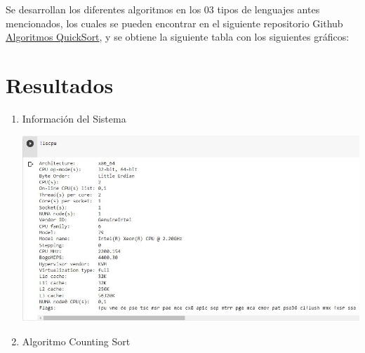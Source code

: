 \documentclass{article}
\begin{document}
  Se desarrollan los diferentes algoritmos en los 03 tipos de lenguajes antes mencionados, los cuales se pueden encontrar en el siguiente repositorio Github \href{https://github.com/josuemzx/Algoritmos_de_ordenamiento-}{Algoritmos QuickSort}, y se obtiene la siguiente tabla con los siguientes gráficos:


\section{Resultados}


    \begin{enumerate}
        \item Información del Sistema
        
        \includegraphics[width=\textwidth]{Imagen/Captura1}
	   
        \item Algoritmo Counting Sort
        

\end{enumerate}
\end{document}
